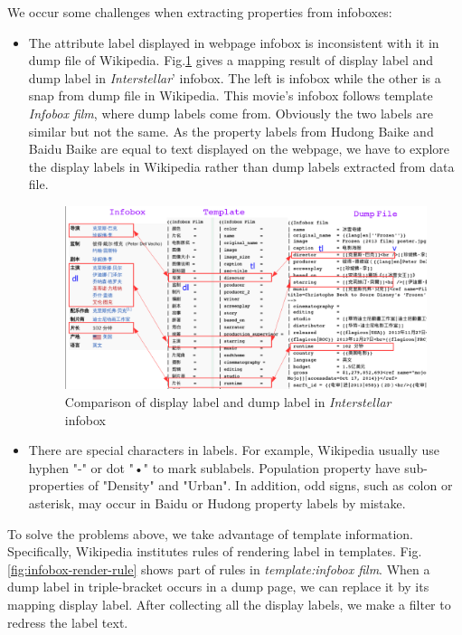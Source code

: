 \documentclass[runningheads,a4paper]{llncs}
\begin{document}
We occur some challenges when extracting properties from infoboxes:
\begin{itemize}
    \item The attribute label displayed in webpage infobox is inconsistent with it in dump file of Wikipedia. Fig.\ref{fig:infobox-template} gives a mapping result of display label and dump label in \emph{Interstellar}' infobox. The left is infobox while the other is a snap from dump file in Wikipedia. This movie's infobox follows template \emph{Infobox film}, where dump labels come from. Obviously the two labels are similar but not the same. As the property labels from Hudong Baike and Baidu Baike are equal to text displayed on the webpage, we have to explore the display labels in Wikipedia rather than dump labels extracted from data file.
    \begin{figure}[ht]
        \centerline{\includegraphics[width=1\columnwidth]{fig/infobox-template}}
        \label{fig:infobox-template}
        \caption{Comparison of display label and dump label in \emph{Interstellar} infobox}
    \end{figure}%
    \item There are special characters in labels. For example, Wikipedia usually use hyphen "-" or dot "•" to mark sublabels. Population property have sub-properties of "Density" and "Urban". In addition, odd signs, such as colon or asterisk, may occur in Baidu or Hudong property labels by mistake.
\end{itemize}

To solve the problems above, we take advantage of template information. Specifically, Wikipedia institutes rules of rendering label in templates. Fig.\ref{fig:infobox-render-rule} shows part of rules in \emph{template:infobox film}. When a dump label in triple-bracket occurs in a dump page, we can replace it by its mapping display label. After collecting all the display labels, we make a filter to redress the label text.
\end{document}
